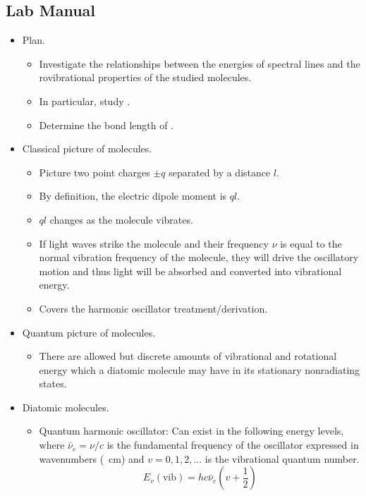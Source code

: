 \documentclass[../notes.tex]{subfiles}
\begin{document}
\subsection*{Lab Manual}
\begin{itemize}
    \item Plan.
    \begin{itemize}
        \item Investigate the relationships between the energies of spectral lines and the rovibrational properties of the studied molecules.
        \item In particular, study .
        \item Determine the bond length of .
    \end{itemize}
    \item Classical picture of molecules.
    \begin{itemize}
        \item Picture two point charges $\pm q$ separated by a distance $l$.
        \item By definition, the electric dipole moment is $ql$.
        \item $ql$ changes as the molecule vibrates.
        \item If light waves strike the molecule and their frequency $\nu$ is equal to the normal vibration frequency of the molecule, they will drive the oscillatory motion and thus light will be absorbed and converted into vibrational energy.
        \item Covers the harmonic oscillator treatment/derivation.
    \end{itemize}
    \item Quantum picture of molecules.
    \begin{itemize}
        \item There are allowed but discrete amounts of vibrational and rotational energy which a diatomic molecule may have in its stationary nonradiating states.
    \end{itemize}
    \item Diatomic molecules.
    \begin{itemize}
        \item Quantum harmonic oscillator: Can exist in the following energy levels, where $\bar{\nu}_e=\nu/c$ is the fundamental frequency of the oscillator expressed in wavenumbers (\si{\per\centi\meter}) and $v=0,1,2,\dots$ is the vibrational quantum number.
        \begin{equation*}
            E_v(\text{vib}) = hc\bar{\nu}_e\left( v+\frac{1}{2} \right)

\end{equation*}
\end{itemize}
\end{itemize}
\end{document}
